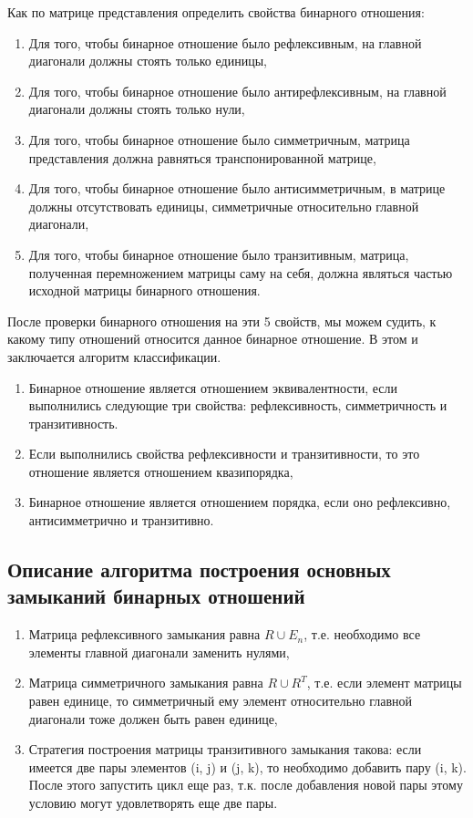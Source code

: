 \documentclass[bachelor, och, labwork]{shiza}
\begin{document}
		Как по матрице представления определить свойства бинарного отношения:
	\begin{enumerate}
		\item Для того, чтобы бинарное отношение было $\textit{рефлексивным}$, на главной  диагонали должны стоять только единицы,
		\item Для того, чтобы бинарное отношение было $\textit{антирефлексивным}$, на главной  диагонали должны стоять только нули,
		\item Для того, чтобы бинарное отношение было $\textit{симметричным}$, матрица представления должна равняться транспонированной матрице,
		\item Для того, чтобы бинарное отношение было $\textit{антисимметричным}$, в матрице должны отсутствовать единицы, симметричные относительно главной диагонали,
		\item Для того, чтобы бинарное отношение было $\textit{транзитивным}$, матрица, полученная перемножением матрицы саму на себя, должна являться частью исходной матрицы бинарного отношения.
	\end{enumerate}
	
	После проверки бинарного отношения на эти 5 свойств, мы можем судить,  к какому типу отношений относится данное бинарное отношение. В этом  и заключается алгоритм классификации.
	
	\begin{enumerate}
		\item Бинарное отношение является отношением эквивалентности, если выполнились следующие три свойства: рефлексивность, симметричность и транзитивность.
		\item Если выполнились свойства рефлексивности и транзитивности, то это отношение является отношением квазипорядка,
		\item Бинарное отношение является отношением порядка, если оно рефлексивно, антисимметрично и транзитивно.
	\end{enumerate}	
	
	\subsection{Описание алгоритма построения основных замыканий бинарных отношений}
	
	\begin{enumerate}
		\item Матрица $\textit{рефлексивного}$ замыкания равна $R \cup E_n$, т.е. необходимо все элементы главной диагонали заменить нулями,
		\item Матрица $\textit{симметричного}$ замыкания равна $R \cup R^T$, т.е. если элемент матрицы равен единице, то симметричный ему элемент относительно главной диагонали тоже должен быть равен единице,
		\item Стратегия построения матрицы $\textit{транзитивного}$ замыкания такова: если имеется две пары элементов (i, j) и (j, k), то необходимо добавить пару (i, k). После этого запустить цикл еще раз, т.к. после добавления новой пары этому условию могут удовлетворять еще две пары. 
		
	\end{enumerate}
	
\end{document}
